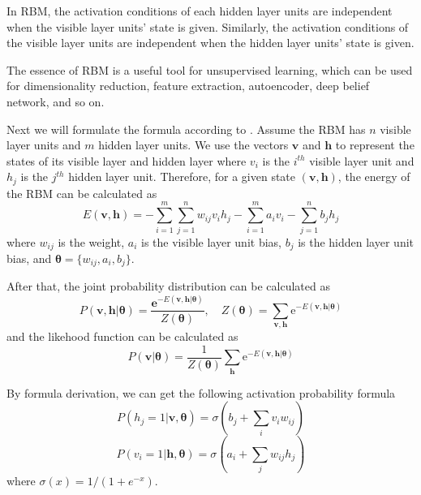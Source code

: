 \documentclass{modified}
\begin{document}
In RBM, the activation conditions of each hidden layer units are independent when the visible layer units' state is given. Similarly, the activation conditions of the visible layer units are independent when the hidden layer units' state is given.

The essence of RBM is a useful tool for unsupervised learning, which can be used for dimensionality reduction, feature extraction, autoencoder, deep belief network, and so on.

Next we will formulate the formula according to \cite{zhangchunxia}. Assume the RBM has $n$ visible layer units and $m$ hidden layer units. We use the vectors $\mathbf{v}$ and $\mathbf{h}$ to represent the states of its visible layer and hidden layer where $v_i$ is the $i^{th}$ visible layer unit and $h_j$ is the $j^{th}$ hidden layer unit. Therefore, for a given state $(\mathbf{v}, \mathbf{h})$, the energy of the RBM can be calculated as
\begin{equation}
E(\mathbf{v}, \mathbf{h})=-\sum_{i=1}^{m} \sum_{j=1}^{n} w_{i j} v_{i} h_{j}-\sum_{i=1}^{m} a_{i} v_{i}-\sum_{j=1}^{n} b_{j} h_{j}
\end{equation}
where $w_{ij}$ is the weight, $a_{i}$ is the visible layer unit bias, $b_{j}$ is the hidden layer unit bias, and $\boldsymbol{\theta}=\{w_{ij}, a_i, b_j\}$.

After that, the joint probability distribution can be calculated as 
\begin{equation}
P(\mathbf{v}, \mathbf{h} | \boldsymbol{\theta})=\frac{\mathbf{e}^{-E(\mathbf{v}, \mathbf{h} | \boldsymbol{\theta})}}{Z(\boldsymbol{\theta})}, \quad Z(\boldsymbol{\theta})=\sum_{\mathbf{v}, \mathbf{h}} \mathrm{e}^{-E(\mathbf{v}, \mathbf{h} | \boldsymbol{\theta})}
\end{equation}
and the likehood function can be calculated as
\begin{equation}
P(\mathbf{v} | \boldsymbol{\theta})=\frac{1}{Z(\boldsymbol{\theta})} \sum_{\mathbf{h}} \mathrm{e}^{-E(\mathbf{v}, \mathbf{h} | \boldsymbol{\theta})}
\end{equation}

By formula derivation, we can get the following activation probability formula
\begin{equation}
P\left(h_{j}=1 | \mathbf{v}, \boldsymbol{\theta}\right)=\sigma\left(b_{j}+\sum_{i} v_{i} w_{i j}\right)
\end{equation}
\begin{equation}
P\left(v_{i}=1 | \mathbf{h}, \boldsymbol{\theta}\right)=\sigma\left(a_{i}+\sum_{j} w_{i j} h_{j}\right)
\end{equation}
where $\sigma(x)=1/(1+e^{-x})$.
\end{document}
